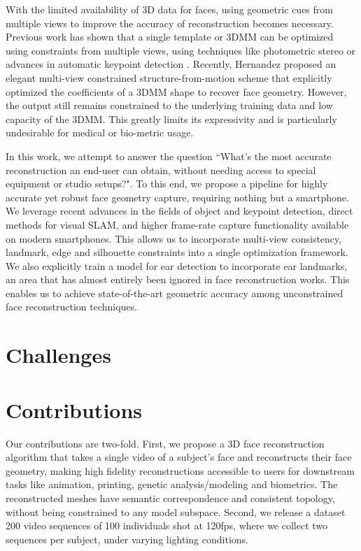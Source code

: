 With the limited availability of 3D data for faces, using geometric cues from multiple views to improve the accuracy of reconstruction becomes necessary. Previous work has shown that a single template or 3DMM can be optimized using constraints from multiple views, using techniques like photometric stereo \cite{roth2015unconstrained} or advances in automatic keypoint detection \cite{huber2016multiresolution}.
Recently, Hernandez \etal \cite{hernandez2017accurate} proposed an elegant multi-view constrained structure-from-motion scheme that explicitly optimized the coefficients of a 3DMM shape to recover face geometry. However, the output still remains constrained to the underlying training data and low capacity of the 3DMM. This greatly limits its expressivity and is particularly undesirable for medical or bio-metric usage. 


In this work, we attempt to answer the question ``What's the most accurate reconstruction an end-user can obtain, without needing access to special equipment or studio setups?". To this end, we propose a pipeline for highly accurate yet robust face geometry capture, requiring nothing but a smartphone. We leverage recent advances in the fields of object and keypoint detection, direct methods for visual SLAM, and higher frame-rate capture functionality available on modern smartphones. This allows us to incorporate multi-view consistency, landmark, edge and silhouette constraints into a single optimization framework. We also explicitly train a model for ear detection to incorporate ear landmarks, an area that has almost entirely been ignored in face reconstruction works. This enables us to achieve state-of-the-art geometric accuracy among unconstrained face reconstruction techniques. 

\section{Challenges}



\section{Contributions}

Our contributions are two-fold. First, we propose a 3D face reconstruction algorithm that takes a single video of a subject's face and reconstructs their face geometry, making high fidelity reconstructions accessible to users for downstream tasks like animation, printing, genetic analysis/modeling and biometrics. The reconstructed meshes have semantic correspondence and consistent topology, without being constrained to any model subspace.  Second, we release a dataset 200 video sequences of 100 individuals shot at 120fps, where we collect two sequences per subject, under varying lighting conditions. 



